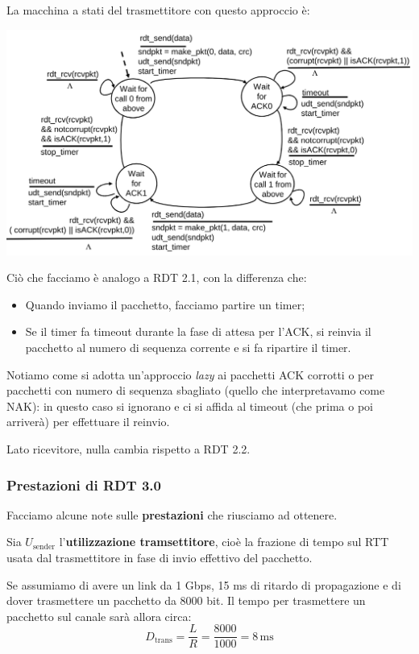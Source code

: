 \documentclass[a4paper,11pt]{article}
\begin{document}
La macchina a stati del trasmettitore con questo approccio è:
\begin{center}
	\includegraphics[scale=0.25]{../figures/rdt3fsm.png}
\end{center}

Ciò che facciamo è analogo a RDT 2.1, con la differenza che:
\begin{itemize}
	\item Quando inviamo il pacchetto, facciamo partire un timer;
	\item Se il timer fa timeout durante la fase di attesa per l'ACK, si reinvia il pacchetto al numero di sequenza corrente e si fa ripartire il timer.
\end{itemize}

Notiamo come si adotta un'approccio \textit{lazy} ai pacchetti ACK corrotti o per pacchetti con numero di sequenza sbagliato (quello che interpretavamo come NAK): in questo caso si ignorano e ci si affida al timeout (che prima o poi arriverà) per effettuare il reinvio.

Lato ricevitore, nulla cambia rispetto a RDT 2.2.

\subsubsection{Prestazioni di RDT 3.0}
Facciamo alcune note sulle \textbf{prestazioni} che riusciamo ad ottenere.

Sia $U_\text{sender}$ l'\textbf{utilizzazione tramsettitore}, cioè la frazione di tempo sul RTT usata dal trasmettitore in fase di invio effettivo del pacchetto.

Se assumiamo di avere un link da 1 Gbps, 15 ms di ritardo di propagazione e di dover trasmettere un pacchetto da 8000 bit.
Il tempo per trasmettere un pacchetto sul canale sarà allora circa:
$$
D_{\text{trans}} = \frac{L}{R} = \frac{8000}{1000} = 8 \, \text{ms}
$$
\end{document}
